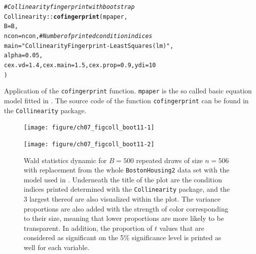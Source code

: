 \documentclass[11pt,a4paper,twoside]{book}\usepackage[]{graphicx}\usepackage[]{xcolor}
\makeatletter
\newcommand{\hlnum}[1]{\textcolor[rgb]{0.686,0.059,0.569}{#1}}%
\newcommand{\hlstr}[1]{\textcolor[rgb]{0.192,0.494,0.8}{#1}}%
\newcommand{\hlcom}[1]{\textcolor[rgb]{0.678,0.584,0.686}{\textit{#1}}}%
\newcommand{\hlopt}[1]{\textcolor[rgb]{0,0,0}{#1}}%
\newcommand{\hlstd}[1]{\textcolor[rgb]{0.345,0.345,0.345}{#1}}%
\newcommand{\hlkwc}[1]{\textcolor[rgb]{0.333,0.667,0.333}{#1}}%
\newcommand{\hlkwd}[1]{\textcolor[rgb]{0.737,0.353,0.396}{\textbf{#1}}}%
\newenvironment{kframe}{%
 \def\at@end@of@kframe{}%
 \ifinner\ifhmode%
  \def\at@end@of@kframe{\end{minipage}}%
  \begin{minipage}{\columnwidth}%
 \fi\fi%
 \def\FrameCommand##1{\hskip\@totalleftmargin \hskip-\fboxsep
 \colorbox{shadecolor}{##1}\hskip-\fboxsep
     \hskip-\linewidth \hskip-\@totalleftmargin \hskip\columnwidth}%
 \MakeFramed {\advance\hsize-\width
   \@totalleftmargin\z@ \linewidth\hsize
   \@setminipage}}%
 {\par\unskip\endMakeFramed%
 \at@end@of@kframe}
\newenvironment{knitrout}{}{} %
\makeatother
\begin{document}
\begin{program}[H]
\begin{knitrout}
\color{fgcolor}\begin{kframe}
\begin{alltt}
\hlcom{# Collinearity fingerprint with bootstrap}
\hlstd{Collinearity}\hlopt{::}\hlkwd{cofingerprint}\hlstd{(mpaper,}
        \hlkwc{B} \hlstd{= B,}
        \hlkwc{ncon} \hlstd{= ncon,} \hlcom{# Number of printed condition indices}
        \hlkwc{main} \hlstd{=} \hlstr{"Collinearity Fingerprint - Least Squares (lm)"}\hlstd{,}
        \hlkwc{alpha} \hlstd{=} \hlnum{0.05}\hlstd{,}
        \hlkwc{cex.vd} \hlstd{=} \hlnum{1.4}\hlstd{,} \hlkwc{cex.main} \hlstd{=} \hlnum{1.5}\hlstd{,} \hlkwc{cex.prop}  \hlstd{=} \hlnum{0.9}\hlstd{,} \hlkwc{ydi} \hlstd{=} \hlnum{10}
        \hlstd{)}
\end{alltt}
\end{kframe}
\end{knitrout}
\caption{Application of the \texttt{cofingerprint} function. \texttt{mpaper} is the so called basic equation model fitted in \cite{Harrison1978}. The source code of the function \texttt{cofingerprint} can be found in the \texttt{Collinearity} package.}\label{code:collfingerprint}
\end{program}

\newpage
\begin{figure}[H]%
\centering
\begin{knitrout}
\color{fgcolor}
\texttt{[image: figure/ch07\_figcoll\_boot11-1]} 

\texttt{[image: figure/ch07\_figcoll\_boot11-2]} 
\end{knitrout}
\vspace*{-10mm}
\caption{Wald statistics dynamic for $B=500$ repeated draws of size $n=506$ with replacement from the whole \texttt{BostonHousing2} data set with the model used in \cite{Harrison1978}. Underneath the title of the plot are the condition indices printed determined with the \texttt{Collinearity} package, and the 3 largest thereof are also visualized within the plot.
The variance proportions are also added with the strength of color corresponding to their size, meaning that lower proportions are more likely to be transparent. In addition, the proportion of $t$ values that are considered as significant on the 5\% significance level is printed as well for each variable.}
\label{fig:coll_boot1}
\end{figure}
\end{document}
